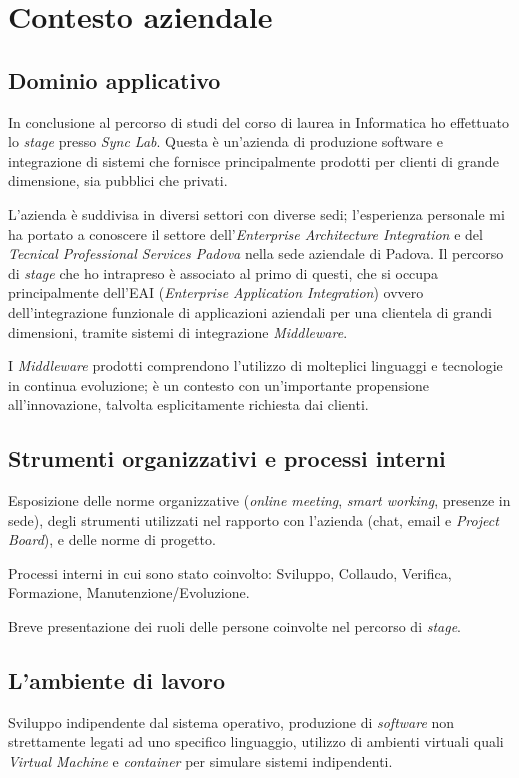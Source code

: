 \chapter{Contesto aziendale}

\section{Dominio applicativo}
In conclusione al percorso di studi del corso di laurea in Informatica ho effettuato lo \textit{stage} presso \textit{Sync Lab}.
Questa è un'azienda di produzione software e integrazione di sistemi che fornisce principalmente prodotti per clienti di grande dimensione, sia pubblici che privati.

L'azienda è suddivisa in diversi settori con diverse sedi; l'esperienza personale mi ha portato a conoscere il settore dell'\textit{Enterprise Architecture Integration} e del \textit{Tecnical Professional Services Padova} nella sede aziendale di Padova.
Il percorso di \textit{stage} che ho intrapreso è associato al primo di questi, che si occupa principalmente dell'EAI (\textit{Enterprise Application Integration}) ovvero dell'integrazione funzionale di applicazioni aziendali per una clientela di grandi dimensioni, tramite sistemi di integrazione \textit{Middleware}.

I \textit{Middleware} prodotti comprendono l'utilizzo di molteplici linguaggi e tecnologie in continua evoluzione; è un contesto con un'importante propensione all'innovazione, talvolta esplicitamente richiesta dai clienti.

\section{Strumenti organizzativi e processi interni}

Esposizione delle norme organizzative (\textit{online meeting}, \textit{smart working}, presenze in sede), degli strumenti utilizzati nel rapporto con l’azienda (chat, email e \textit{Project Board}), e delle norme di progetto.

\bigskip\noindent
Processi interni in cui sono stato coinvolto: Sviluppo, Collaudo, Verifica, Formazione, Manutenzione/Evoluzione.

\bigskip\noindent
Breve presentazione dei ruoli delle persone coinvolte nel percorso di \textit{stage}.

\section{L’ambiente di lavoro}

Sviluppo indipendente dal sistema operativo, produzione di \textit{software} non strettamente legati ad uno specifico linguaggio, utilizzo di ambienti virtuali quali \textit{Virtual Machine} e \textit{container} per simulare sistemi indipendenti.
